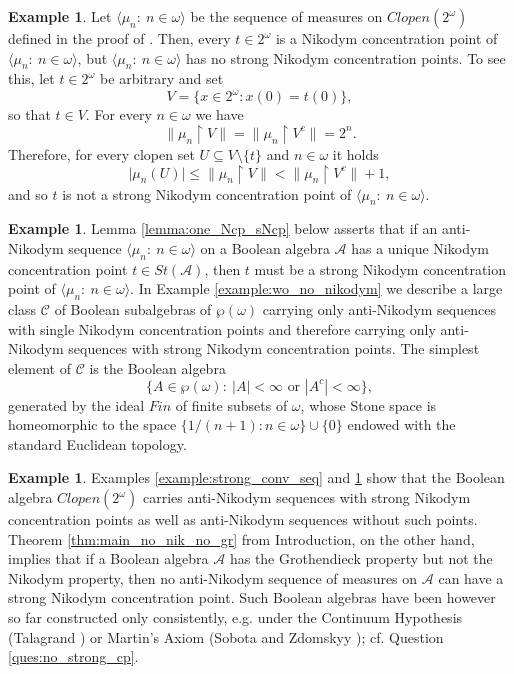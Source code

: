 \documentclass[a4paper,11pt,fleqn]{amsart}
\theoremstyle{definition}
\newtheorem{example}[theorem]{Example}
\theoremstyle{remark}
\numberwithin{equation}{section}
\newcommand{\N}{\mathbb{N}}
\newcommand{\aA}{\mathcal{A}}
\newcommand{\cCs}{\mathscr{C}}
\newcommand{\cCc}{\cCs}
\newcommand{\rstr}{\restriction}
\newcommand{\sm}{\setminus}
\newcommand{\sub}{\subseteq}
\newcommand{\seqn}[1]{\big\langle#1\colon\ n\io\big\rangle}
\newcommand{\io}{\in\omega}%
\newcommand{\wo}{{\wp(\omega)}}%
\newcommand{\Cantor}{2^\omega}
\begin{document}
\begin{example}\label{example:strong_no}
Let $\seqn{\mu_n}$ be the sequence of measures on $Clopen(\Cantor)$ defined in the proof of \cite[Proposition 4.6]{Sob19}. Then, every $t\in \Cantor$ is a Nikodym concentration point of $\seqn{\mu_n}$, but $\seqn{\mu_n}$ has no strong Nikodym concentration points. To see this, let $t\in\Cantor$ be arbitrary and set
\[V=\big\{x\in\Cantor\colon x(0)=t(0)\big\},\]
so that $t\in V$. For every $n\io$ we have
\[\big\|\mu_n\rstr V\big\| = \big\|\mu_n\rstr V^c\big\| = 2^n.\]
Therefore, for every clopen set $U\sub V\sm\{t\}$ and $n\io$ it holds
\[\big|\mu_n(U)\big|\le\big\|\mu_n\rstr V\big\|<\big\|\mu_n\rstr V^c\big\|+1,\]
and so $t$ is not a strong Nikodym concentration point of $\seqn{\mu_n}$.
\end{example}

\begin{example}\label{example:strong_only}
Lemma \ref{lemma:one_Ncp_sNcp} below asserts that if an anti-Nikodym sequence $\seqn{\mu_n}$ on a Boolean algebra $\aA$ has a unique Nikodym concentration point $t\in St(\aA)$, then $t$ must be a strong Nikodym concentration point of $\seqn{\mu_n}$. In Example \ref{example:wo_no_nikodym} we describe a large class $\cCc$ of Boolean subalgebras of $\wo$ carrying only anti-Nikodym sequences with single Nikodym concentration points and therefore carrying only anti-Nikodym sequences with strong Nikodym concentration points. The simplest element of $\cCc$ is the Boolean algebra
\[\big\{A\in\wo\colon\ |A|<\infty\text{ or }|A^c|<\infty\big\},\]
generated by the ideal $Fin$ of finite subsets of $\omega$, whose Stone space is homeomorphic to the space $\{1/(n+1)\colon n\io\}\cup\{0\}$ endowed with the standard Euclidean topology.
\end{example}


\begin{example}\label{example:strong_consistently_no}
    Examples \ref{example:strong_conv_seq} and \ref{example:strong_no} show that the Boolean algebra $Clopen(\Cantor)$ carries anti-Nikodym sequences with strong Nikodym concentration points as well as anti-Nikodym sequences without such points.
    Theorem \ref{thm:main_no_nik_no_gr} from Introduction, on the other hand, implies that if a Boolean algebra $\aA$ has the Grothendieck property but not the Nikodym property, then no anti-Nikodym sequence of measures on $\aA$ can have a strong Nikodym concentration point. Such Boolean algebras have been however so far constructed only consistently, e.g. under the Continuum Hypothesis (Talagrand \cite{Tal84}) or Martin's Axiom (Sobota and Zdomskyy \cite{SZ23g}); cf. Question \ref{ques:no_strong_cp}.
\end{example}
\end{document}
